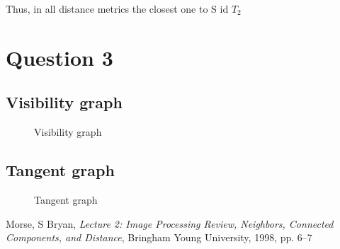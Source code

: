 \documentclass[10pt]{article}
\begin{document}
		Thus, in all distance metrics the closest one to S id $T_2$
	\newpage
	\section{Question 3}
		\subsection{Visibility graph}
			\begin{figure}[h!]
				\caption{Visibility graph}
				\label{fig:modules}
			\end{figure}
		\subsection{Tangent graph}
			\begin{figure}[h!]
				\caption{Tangent graph}
				\label{fig:modules1}
			\end{figure}
		\newpage
	\begin{thebibliography}{1}
		 Morse, S Bryan, \emph{Lecture 2: Image Processing Review, Neighbors, Connected Components, and Distance}, Bringham Young University, 1998, pp. 6--7
	\end{thebibliography}
\end{document}
